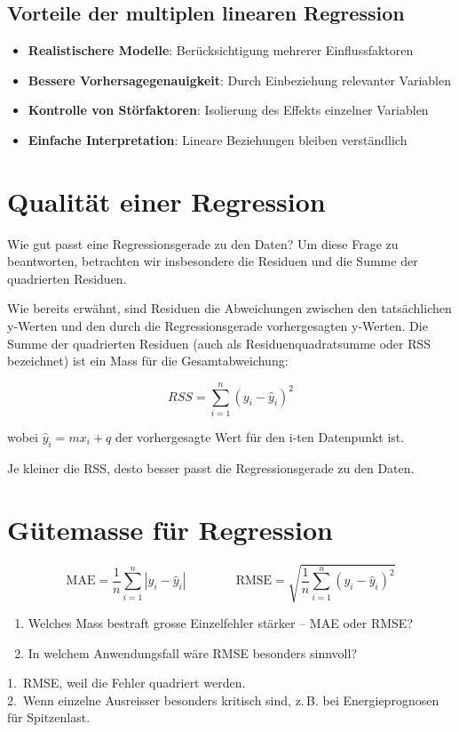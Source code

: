 \subsection{Vorteile der multiplen linearen Regression}

\begin{itemize}
	\item \textbf{Realistischere Modelle}: Berücksichtigung mehrerer Einflussfaktoren
	\item \textbf{Bessere Vorhersagegenauigkeit}: Durch Einbeziehung relevanter Variablen
	\item \textbf{Kontrolle von Störfaktoren}: Isolierung des Effekts einzelner Variablen
	\item \textbf{Einfache Interpretation}: Lineare Beziehungen bleiben verständlich
\end{itemize}

\section{Qualität einer Regression}

Wie gut passt eine Regressionsgerade zu den Daten? Um diese Frage zu beantworten, betrachten wir insbesondere die Residuen und die Summe der quadrierten Residuen.

Wie bereits erwähnt, sind Residuen die Abweichungen zwischen den tatsächlichen y-Werten und den durch die Regressionsgerade vorhergesagten y-Werten. Die Summe der quadrierten Residuen (auch als Residuenquadratsumme oder RSS bezeichnet) ist ein Mass für die Gesamtabweichung:

\[RSS = \sum_{i=1}^{n} (y_i - \hat{y}_i)^2\]

wobei $\hat{y}_i = mx_i + q$ der vorhergesagte Wert für den i-ten Datenpunkt ist.

Je kleiner die RSS, desto besser passt die Regressionsgerade zu den Daten.

\section{Gütemasse für Regression}

\begin{mydefinition}
\[
\text{MAE} = \frac{1}{n}\sum_{i=1}^{n} |y_i - \hat{y}_i|
\qquad\qquad
\text{RMSE} = \sqrt{\frac{1}{n}\sum_{i=1}^{n} (y_i - \hat{y}_i)^2}
\]
\end{mydefinition}

\begin{myexercise}
\begin{enumerate}
    \item Welches Mass bestraft grosse Einzelfehler stärker -- MAE oder RMSE?
    \item In welchem Anwendungsfall wäre RMSE besonders sinnvoll?
\end{enumerate}
\begin{myanswer}
1.\ RMSE, weil die Fehler quadriert werden. \\
2.\ Wenn einzelne Ausreisser besonders kritisch sind, z.\,B. bei Energieprognosen für Spitzenlast.
\end{myanswer}
\end{myexercise}

